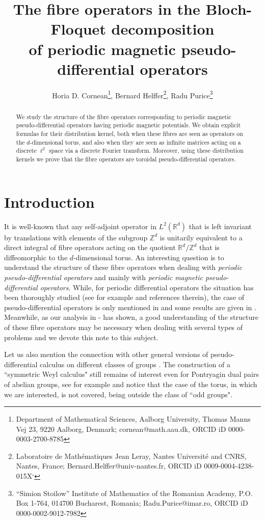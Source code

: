\documentclass[12pt]{article}
\title{The fibre operators in the Bloch-Floquet decomposition\\of periodic magnetic pseudo-differential operators}
\author{Horia D. Cornean\footnote{Department of Mathematical Sciences, Aalborg University, Thomas Manns Vej 23, 9220 Aalborg, Denmark; cornean@math.aau.dk, ORCID iD 0000-0003-2700-8785}, Bernard Helffer\footnote{Laboratoire de Math{\'e}matiques Jean Leray,  Nantes Universit{\'e}  and CNRS, Nantes, France;
Bernard.Helffer@univ-nantes.fr, ORCID iD 0009-0004-4238-015X`}, Radu Purice\footnote{\enquote{Simion Stoilow} Institute of Mathematics of the Romanian Academy, P.O. Box 1-764, 014700 Bucharest, Romania; Radu.Purice@imar.ro, ORCID iD 0000-0002-9012-7982}}
\theoremstyle{definition}
\def\Rd{\mathbb{R}^d}
\def\Zd{\mathbb{Z}^d}
\numberwithin{equation}{section}
\begin{document}
\maketitle

\begin{abstract}
We study the structure of the fibre operators corresponding to  periodic magnetic pseudo-differential operators having periodic magnetic potentials. We obtain explicit formulas for their
distribution kernel, both when these fibres are seen as operators on the $d$-dimensional torus,
and also when they are seen as infinite matrices acting on a discrete $\ell^2$ space via a 
discrete Fourier transform. Moreover, using these distribution kernels we prove that the fibre
operators are toroidal pseudo-differential operators.
\end{abstract}




\section{Introduction}

It  is well-known that any self-adjoint operator in $L^2(\Rd)$ that is left invariant by translations with elements of the subgroup $\Zd $ is unitarily equivalent to a direct integral of fibre operators acting on the quotient $\Rd/\Zd$ that is diffeomorphic to the $d$-dimensional torus. An interesting question is to understand the structure of these fibre operators when dealing with \textit{periodic pseudo-differential operators} and mainly with \textit{periodic magnetic pseudo-differential operators}. While, for periodic differential operators the situation has been thoroughly studied (see for example \cite{Ku-1, Ku-2} and references therein), the case of pseudo-differential operators is only mentioned in \cite{Ku-1} and some results are given in \cite{HM,Mo}. Meanwhile, as our analysis in \cite{CHP-1}-\cite{CHP-4} has shown, a good understanding of the structure of these fibre operators may be necessary when dealing with several types of problems and we devote this note to this subject.

{
Let us also mention the connection with other general versions of pseudo-differential calculus on different classes of groups \cite{P,BB,MR,FRR}. The construction of a ``symmetric Weyl calculus" still remains of interest even for Pontryagin dual pairs of abelian groups, see for example  \cite{W} and notice that the case of the torus, in which we are interested, is not covered, being outside the class of ``odd groups".}
\end{document}
